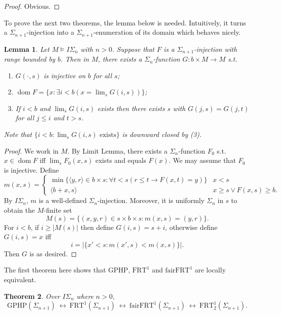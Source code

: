 \documentclass[twoside,a4paper]{amsart}
\newtheorem{theorem}{Theorem}[section]
\newtheorem{lemma}[theorem]{Lemma}
\theoremstyle{definition}
\theoremstyle{theorem}
\numberwithin{equation}{section}
\newcommand{\<}{\langle}
\renewcommand{\>}{\rangle}
\newcommand{\dom}{\operatorname{dom}}
\newcommand{\GPHP}{\mathrm{GPHP}}
\newcommand{\FRT}{\mathrm{FRT}}
\newcommand{\fairFRT}{\mathrm{fairFRT}}
\begin{document}
\begin{proof}
Obvious.
\end{proof}

To prove the next two theorems, the lemma below is needed.
Intuitively, it turns a $\Sigma_{n+1}$-injection into a $\Sigma_{n+1}$-enumeration of its domain which behaves nicely.

\begin{lemma}\label{lem:ISigma-tame-inj}
Let $M \models I\Sigma_n$ with $n > 0$.
Suppose that $F$ is a $\Sigma_{n+1}$-injection with range bounded by $b$.
Then in $M$, there exists a $\Sigma_{n}$-function $G: b \times M \to M$ s.t.
\begin{enumerate}
  \item $G(\cdot,s)$ is injective on $b$ for all $s$;
  \item $\dom F = \{x: \exists i < b (x = \lim_s G(i,s))\}$;
  \item If $i < b$ and $\lim_s G(i,s)$ exists then there exists $s$ with $G(j,s) = G(j,t)$ for all $j \leq i$ and $t > s$.
\end{enumerate}
Note that $\{i < b: \lim_s G(i,s) \text{ exists}\}$ is downward closed by (3).
\end{lemma}

\begin{proof}
We work in $M$.
By Limit Lemma, there exists a $\Sigma_n$-function $F_0$ s.t. $x \in \dom F$ iff $\lim_s F_0(x,s)$ exists and equals $F(x)$.
We may assume that $F_0$ is injective.
Define
\[
  m(x,s) = 
  \begin{cases}
    \min\{\<y,r\> \in b \times s: \forall t < s(r \leq t \to F(x,t) = y)\} & x < s \\
    \<b+x,s\> & x \geq s \vee F(x,s) \geq b.
  \end{cases}
\]
By $I\Sigma_n$, $m$ is a well-defined $\Sigma_n$-injection.
Moreover, it is uniformly $\Sigma_n$ in $s$ to obtain the $M$-finite set
\[
  M(s) = \{(x,y,r) \in s \times b \times s: m(x,s) = (y,r)\}.
\]
For $i < b$, if $i \geq |M(s)|$ then define $G(i,s) = s + i$,
otherwise define $G(i,s) = x$ iff
\[
  i = |\{x' < s: m(x',s) < m(x,s)\}|.
\]
Then $G$ is as desired.
\end{proof}

The first theorem here shows that $\GPHP$, $\FRT^1$ and $\fairFRT^1$ are locally equivalent.

\begin{theorem}\label{thm:GPHP-FRT}
Over $I\Sigma_n$ where $n > 0$,
\[
  \GPHP(\Sigma_{n+1}) \ \leftrightarrow\ \FRT^1(\Sigma_{n+1})
  \ \leftrightarrow\ \fairFRT^1(\Sigma_{n+1}) \ \leftrightarrow\ \FRT^1_2(\Sigma_{n+1}). 
\]
\end{theorem}
\end{document}
